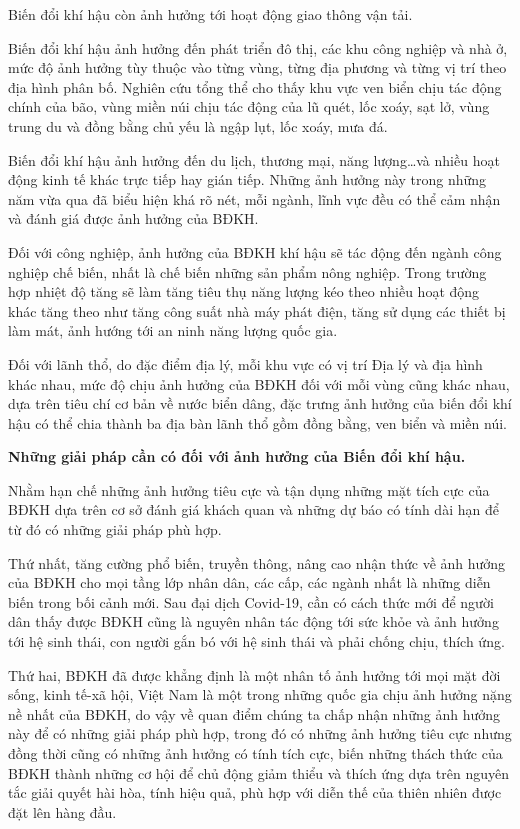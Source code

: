 \begin{enumerate}[label=\bfseries Câu \arabic*:]
{		Biến đổi khí hậu còn ảnh hưởng tới hoạt động giao thông vận tải.
		
		Biến đổi khí hậu ảnh hưởng đến phát triển đô thị, các khu công nghiệp và nhà ở, mức độ ảnh hưởng tùy thuộc vào từng vùng, từng địa phương và từng vị trí theo địa hình phân bố. Nghiên cứu tổng thể cho thấy khu vực ven biển chịu tác động chính của bão, vùng miền núi chịu tác động của lũ quét, lốc xoáy, sạt lở, vùng trung du và đồng bằng chủ yếu là ngập lụt, lốc xoáy, mưa đá.
		
		Biến đổi khí hậu ảnh hưởng đến du lịch, thương mại, năng lượng…và nhiều hoạt động kinh tế khác trực tiếp hay gián tiếp. Những ảnh hưởng này trong những năm vừa qua đã biểu hiện khá rõ nét, mỗi ngành, lĩnh vực đều có thể cảm nhận và đánh giá được ảnh hưởng của BĐKH.
		
		Đối với công nghiệp, ảnh hưởng của BĐKH khí hậu sẽ tác động đến ngành công nghiệp chế biến, nhất là chế biến những sản phẩm nông nghiệp. Trong trường hợp nhiệt độ tăng sẽ làm tăng tiêu thụ năng lượng kéo theo nhiều hoạt động khác tăng theo như tăng công suất nhà máy phát điện, tăng sử dụng các thiết bị làm mát, ảnh hướng tới an ninh năng lượng quốc gia. 
		
		Đối với lãnh thổ, do đặc điểm địa lý, mỗi khu vực có vị trí Địa lý và địa hình khác nhau, mức độ chịu ảnh hưởng của BĐKH đối với mỗi vùng cũng khác nhau, dựa trên tiêu chí cơ bản về nước biển dâng, đặc trưng ảnh hưởng của biến đổi khí hậu có thể chia thành ba địa bàn lãnh thổ gồm đồng bằng, ven biển và miền núi.
		
		\textbf{Những giải pháp cần có đối với ảnh hưởng của Biến đổi khí hậu.}
		
		Nhằm hạn chế những ảnh hưởng tiêu cực và tận dụng những mặt tích cực của BĐKH dựa trên cơ sở đánh giá khách quan và những dự báo có tính dài hạn để từ đó có những giải pháp phù hợp.
		
		Thứ nhất, tăng cường phổ biến, truyền thông, nâng cao nhận thức về ảnh hưởng của BĐKH cho mọi tầng lớp nhân dân, các cấp, các ngành nhất là những diễn biến trong bối cảnh mới. Sau đại dịch Covid-19, cần có cách thức mới để người dân thấy được BĐKH cũng là nguyên nhân tác động tới sức khỏe và ảnh hưởng tới hệ sinh thái, con người gắn bó với hệ sinh thái và phải chống chịu, thích ứng.
		
		Thứ hai, BĐKH đã được khẳng định là một nhân tố ảnh hưởng tới mọi mặt đời sống, kinh tế-xã hội, Việt Nam là một trong những quốc gia chịu ảnh hưởng nặng nề nhất của BĐKH, do vậy về quan điểm chúng ta chấp nhận những ảnh hưởng này để có những giải pháp phù hợp, trong đó có những ảnh hưởng tiêu cực nhưng đồng thời cũng có những ảnh hưởng có tính tích cực, biến những thách thức của BĐKH thành những cơ hội để chủ động giảm thiểu và thích ứng dựa trên nguyên tắc giải quyết hài hòa, tính  hiệu quả, phù hợp với diễn thế của thiên nhiên được đặt lên hàng đầu.
		
}
\end{enumerate}
